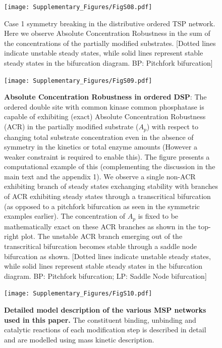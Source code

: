 \documentclass[16pt, a4paper]{article}
\begin{document}
\clearpage
\begin{figure}
    \centering
    \texttt{[image: Supplementary\_Figures/FigS08.pdf]}
    \caption{Case 1 symmetry breaking in the distributive ordered TSP network. Here we observe Absolute Concentration Robustness in the sum of the concentrations of the partially modified substrates. [Dotted lines indicate unstable steady states, while solid lines represent stable steady states in the bifurcation diagram. BP: Pitchfork bifurcation]}
    \label{Fig S8}
\end{figure}

\clearpage
\begin{figure}[ht!]
    \centering
    \texttt{[image: Supplementary\_Figures/FigS09.pdf]}
    \caption{\textbf{Absolute Concentration Robustness in ordered DSP}: The ordered double site with common kinase common phosphatase is capable of exhibiting (exact) Absolute Concentration Robustness (ACR) in the partially modified substrate ($A_p$) with respect to changing total substrate concentration even in the absence of symmetry in the kinetics or total enzyme amounts (However a weaker constraint is required to enable this). The figure presents a computational example of this (complementing the discussion in the main text and the appendix 1). We observe a single non-ACR exhibiting branch of steady states exchanging stability with branches of ACR exhibiting steady states through a transcritical bifurcation (as opposed to a pitchfork bifurcation as seen in the symmetric examples earlier). The concentration of $A_p$ is fixed to be mathematically exact on these ACR branches as shown in the top-right plot. The unstable ACR branch emerging out of the transcritical bifurcation becomes stable through a saddle node bifurcation as shown. [Dotted lines indicate unstable steady states, while solid lines represent stable steady states in the bifurcation diagram. BP: Pitchfork bifurcation; LP: Saddle Node bifurcation]}
    \label{Fig S9}
\end{figure}

\clearpage
\begin{figure}[ht!]
    \centering
    \texttt{[image: Supplementary\_Figures/FigS10.pdf]}
    \caption{\textbf{Detailed model description of the various MSP networks used in this paper.} The constituent binding, unbinding and catalytic reactions of each modification step is described in detail and are modelled using mass kinetic description.}
    \label{Fig S10}
\end{figure}
\end{document}
